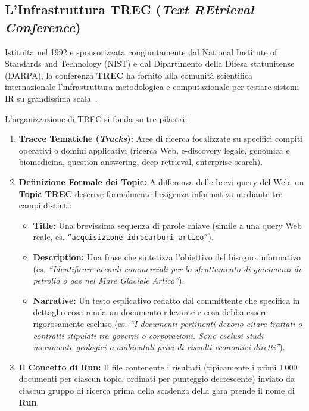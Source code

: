 \FloatBarrier
\subsection{L'Infrastruttura TREC (\textit{Text REtrieval Conference})}
\label{subsec:infrastruttura-trec}

Istituita nel 1992 e sponsorizzata congiuntamente dal National Institute of Standards and Technology (NIST) e dal Dipartimento della Difesa statunitense (DARPA), la conferenza \textbf{TREC} ha fornito alla comunit\`a scientifica internazionale l'infrastruttura metodologica e computazionale per testare sistemi IR su grandissima scala~\cite{manning2008}.

L'organizzazione di TREC si fonda su tre pilastri:
\begin{enumerate}
    \item \textbf{Tracce Tematiche (\textit{Tracks}):} Aree di ricerca focalizzate su specifici compiti operativi o domini applicativi (ricerca Web, e-discovery legale, genomica e biomedicina, question answering, deep retrieval, enterprise search).
    \item \textbf{Definizione Formale dei Topic:} A differenza delle brevi query del Web, un \textbf{Topic TREC} descrive formalmente l'esigenza informativa mediante tre campi distinti:
    \begin{itemize}
        \item \textbf{Title:} Una brevissima sequenza di parole chiave (simile a una query Web reale, es. \texttt{``acquisizione idrocarburi artico''}).
        \item \textbf{Description:} Una frase che sintetizza l'obiettivo del bisogno informativo (es. \textit{``Identificare accordi commerciali per lo sfruttamento di giacimenti di petrolio o gas nel Mare Glaciale Artico''}).
        \item \textbf{Narrative:} Un testo esplicativo redatto dal committente che specifica in dettaglio cosa renda un documento rilevante e cosa debba essere rigorosamente escluso (es. \textit{``I documenti pertinenti devono citare trattati o contratti stipulati tra governi o corporazioni. Sono esclusi studi meramente geologici o ambientali privi di risvolti economici diretti''}).
    \end{itemize}
    \item \textbf{Il Concetto di Run:} Il file contenente i risultati (tipicamente i primi $1\,000$ documenti per ciascun topic, ordinati per punteggio decrescente) inviato da ciascun gruppo di ricerca prima della scadenza della gara prende il nome di \textbf{Run}.
\end{enumerate}

